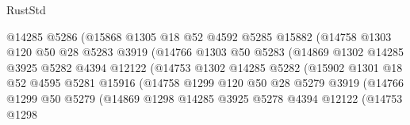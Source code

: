 \begin{lexlean}{RustStd}
\begin{coremodule}
                              @14285
                              @5286
                              (@15868
                                @1305
                                @18
                                @52
                                @4592
                                @5285
                                @15882
                                (@14758
                                  @1303
                                  @120
                                  @50
                                  @28
                                  @5283
                                  @3919
                                  (@14766
                                    @1303
                                    @50
                                    @5283
                                    (@14869
                                      @1302
                                      @14285
                                      @3925
                                      @5282
                                      @4394
                                      @12122
                                      (@14753
                                        @1302
                                        @14285
                                        @5282
                                        (@15902
                                          @1301
                                          @18
                                          @52
                                          @4595
                                          @5281
                                          @15916
                                          (@14758
                                            @1299
                                            @120
                                            @50
                                            @28
                                            @5279
                                            @3919
                                            (@14766
                                              @1299
                                              @50
                                              @5279
                                              (@14869
                                                @1298
                                                @14285
                                                @3925
                                                @5278
                                                @4394
                                                @12122
                                                (@14753
                                                  @1298

\end{coremodule}
\end{lexlean}
